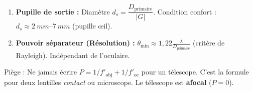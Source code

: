 \documentclass[11pt]{article}
\newcommand{\cle}[1]{{\popxbold\color{popdark}#1}}
\begin{document}
\begin{methode}
\begin{enumerate}
\begin{itemize}
        \item L'oculaire doit former une image virtuelle à $D$. Relation de conjugaison pour l'oculaire (convention Descartes : $p<0$ objet réel, $p'>0$ image réelle, $p'<0$ image virtuelle, $f'>0$ convergente) : $\dfrac{1}{f'_{\text{oc}}} = \dfrac{1}{p'} - \dfrac{1}{p}$ avec $p' = D$ (négatif) et $p = -\overline{O_2A'B'}$ (objet réel pour l'oculaire, donc $p<0$).
        \item Distance oculaire-image intermédiaire : $\overline{O_2A'B'} = |p| = \dfrac{f'_{\text{oc}} |D|}{f'_{\text{oc}} + |D|}$ (valeur absolue $< f'_{\text{oc}}$).
        \item Grossissement angulaire (approché si angles petits) : $G \approx \dfrac{f'_{\text{obj}}}{|p|} = \dfrac{f'_{\text{obj}}}{f'_{\text{oc}}} \left(1 + \frac{f'_{\text{oc}}}{|D|}\right)$.
        \item Pour $D = -\SI{250}{mm}$ (vision nette de près), $G \approx G_{\text{normal}} \left(1 + \frac{f'_{\text{oc}}}{250}\right)$. Le grossissement augmente légèrement.
    \end{itemize}
    \item \textbf{Pupille de sortie :} Diamètre $d_s = \dfrac{D_{\text{primaire}}}{|G|}$. Condition confort : $d_s \approx \SIrange{2}{7}{mm}$ (pupille œil).
    \item \textbf{Pouvoir séparateur (Résolution) :} $\theta_{\min} \approx 1{,}22 \frac{\lambda}{D_{\text{primaire}}}$ (critère de Rayleigh). Indépendant de l'oculaire.
\end{enumerate}
\cle{Piège} : Ne jamais écrire $P = 1/f'_{\text{obj}} + 1/f'_{\text{oc}}$ pour un télescope. C'est la formule pour deux lentilles \emph{contact} ou microscope. Le télescope est \textbf{afocal} ($P=0$).
\end{methode}
\end{document}

